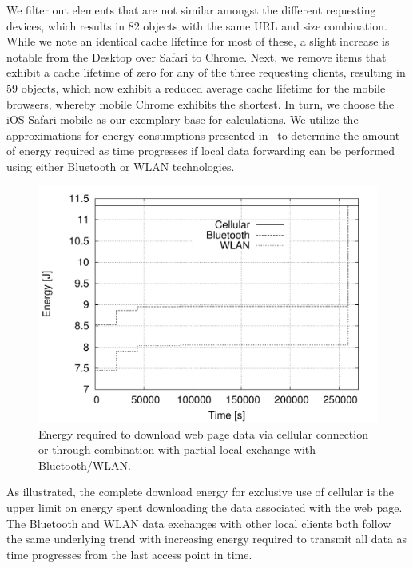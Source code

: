 \documentclass[letterpaper,journal,onecolumn,draftcls]{IEEEtran}
\begin{document}
We filter out elements that are not similar amongst the different requesting devices, which results in 82 objects with the same URL and size combination. 
While we note an identical cache lifetime for most of these, a slight increase is notable from the Desktop over Safari to Chrome.  Next, we remove items that exhibit a cache lifetime of zero for any of the three requesting clients, resulting in 59 objects, which now exhibit a reduced average cache lifetime for the mobile browsers, whereby mobile Chrome exhibits the shortest.
In turn, we choose the iOS Safari mobile as our exemplary base for calculations. 
We utilize the approximations for energy consumptions presented in~\cite{PeFiWi11} to determine the amount of energy required as time progresses if local data forwarding can be performed using either Bluetooth or WLAN technologies. 
\begin{figure}
	\centering
	\includegraphics[width=.5\linewidth]{energy_ios_time}
	\caption{Energy required to download web page data via cellular connection or through combination with partial local exchange with Bluetooth/WLAN.}
	\label{fig:ios_time_energy}
\end{figure}
As illustrated, the complete download energy for exclusive use of cellular is the upper limit on energy spent downloading the data associated with the web page. 
The Bluetooth and WLAN data exchanges with other local clients both follow the same underlying trend with increasing energy required to transmit all data as time progresses from the last access point in time.
\end{document}
